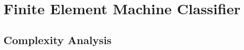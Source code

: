 \section{Finite Element Machine Classifier}
\label{s.fema}

\subsection{Complexity Analysis}
\label{ss.complexity}